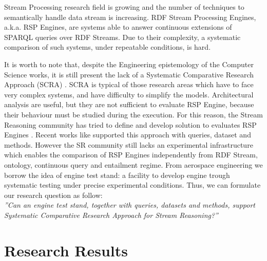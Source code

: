 Stream Processing research field is growing and the number of techniques to semantically handle data stream is increasing. RDF Stream Processing Engines, a.k.a. RSP Engines, are systems able to answer continuous extensions of SPARQL queries over RDF Streams. Due to their complexity, a systematic comparison of such systems, under repeatable conditions, is hard. 

It is worth to note that, despite the Engineering epistemology of the Computer Science works, it is still present the lack of a Systematic Comparative Research Approach (SCRA) \cite{Tichy:1995:EEC:209090.209093}. SCRA is typical of those research areas which have to face very complex systems, and have difficulty to simplify the models. Architectural analysis are useful, but they are not sufficient to evaluate RSP Engine, because their behaviour must be studied during the execution. For this reason, the Stream Reasoning community has tried to define and develop solution to evaluates RSP Engines \cite{DBLP:conf/esws/ScharrenbachUMVB13}. Recent works like \cite{Zhang2012, LePhuoc2012c, DBLP:conf/semweb/DellAglioCBCV13} supported this approach with queries, dataset and methods. However the SR community still lacks an experimental infrastructure which enables the comparison of RSP Engines independently from RDF Stream, ontology, continuous query and entailment regime.  From aerospace engineering we borrow the idea of engine test stand: a facility to develop engine trough systematic testing under precise experimental conditions. Thus, we can formulate our research question as follow:\\

\textit{”Can an engine test stand, together with queries, datasets and methods, support Systematic Comparative Research Approach for Stream Reasoning?”}

\section{Research Results}\label{sec:research-results-conclusion}


